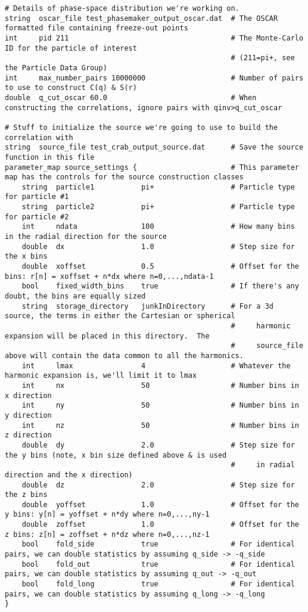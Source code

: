 \documentclass[10pt]{article}
\begin{document}
\begin{verbatim}
# Details of phase-space distribution we're working on.
string  oscar_file test_phasemaker_output_oscar.dat  # The OSCAR formatted file containing freeze-out points
int     pid 211                                      # The Monte-Carlo ID for the particle of interest 
                                                     # (211=pi+, see the Particle Data Group)
int     max_number_pairs 10000000                    # Number of pairs to use to construct C(q) & S(r)
double  q_cut_oscar 60.0                             # When constructing the correlations, ignore pairs with qinv>q_cut_oscar

# Stuff to initialize the source we're going to use to build the correlation with
string  source_file test_crab_output_source.dat      # Save the source function in this file
parameter_map source_settings {                      # This parameter map has the controls for the source construction classes
    string  particle1           pi+                  # Particle type for particle #1
    string  particle2           pi+                  # Particle type for particle #2
    int     ndata               100                  # How many bins in the radial direction for the source
    double  dx                  1.0                  # Step size for the x bins
    double  xoffset             0.5                  # Offset for the bins: r[n] = xoffset + n*dx where n=0,...,ndata-1
    bool    fixed_width_bins    true                 # If there's any doubt, the bins are equally sized
    string  storage_directory   junkInDirectory      # For a 3d source, the terms in either the Cartesian or spherical
                                                     #     harmonic expansion will be placed in this directory.  The 
                                                     #     source_file above will contain the data common to all the harmonics.
    int     lmax                4                    # Whatever the harmonic expansion is, we'll limit it to lmax
    int     nx                  50                   # Number bins in x direction
    int     ny                  50                   # Number bins in y direction
    int     nz                  50                   # Number bins in z direction
    double  dy                  2.0                  # Step size for the y bins (note, x bin size defined above & is used 
                                                     #     in radial direction and the x direction)
    double  dz                  2.0                  # Step size for the z bins
    double  yoffset             1.0                  # Offset for the y bins: y[n] = yoffset + n*dy where n=0,...,ny-1
    double  zoffset             1.0                  # Offset for the z bins: z[n] = zoffset + n*dz where n=0,...,nz-1
    bool    fold_side           true                 # For identical pairs, we can double statistics by assuming q_side -> -q_side
    bool    fold_out            true                 # For identical pairs, we can double statistics by assuming q_out -> -q_out
    bool    fold_long           true                 # For identical pairs, we can double statistics by assuming q_long -> -q_long
}


\end{verbatim}
\end{document}
